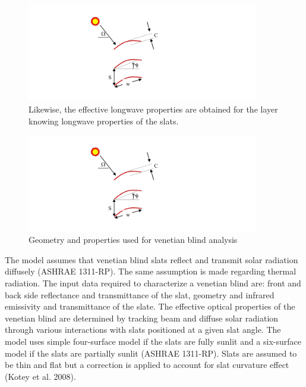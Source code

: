 {\begin{figure}[hbtp] %
\centering
\includegraphics[width=0.9\textwidth, height=0.9\textheight, keepaspectratio=true]{media/image1845.svg.png}
\caption{Likewise, the effective longwave properties are obtained for the layer knowing longwave properties of the slats. \protect \label{fig:likewise-the-effective-longwave-properties}}
\end{figure}

\begin{figure}[hbtp] %
\centering
\includegraphics[width=0.9\textwidth, height=0.9\textheight, keepaspectratio=true]{media/image1846.svg.png}
\caption{Geometry and properties used for venetian blind analysis \protect \label{fig:geometry-and-properties-used-for-venetian}}
\end{figure}

The model assumes that venetian blind slats reflect and transmit solar radiation diffusely (ASHRAE 1311-RP). The same assumption is made regarding thermal radiation. The input data required to characterize a venetian blind are: front and back side reflectance and transmittance of the slat, geometry and infrared emissivity and transmittance of the slate. The effective optical properties of the venetian blind are determined by tracking beam and diffuse solar radiation through various interactions with slats positioned at a given slat angle. The model uses simple four-surface model if the slats are fully sunlit and a six-surface model if the slats are partially sunlit (ASHRAE 1311-RP). Slats are assumed to be thin and flat but a correction is applied to account for slat curvature effect (Kotey et al. 2008).

}
